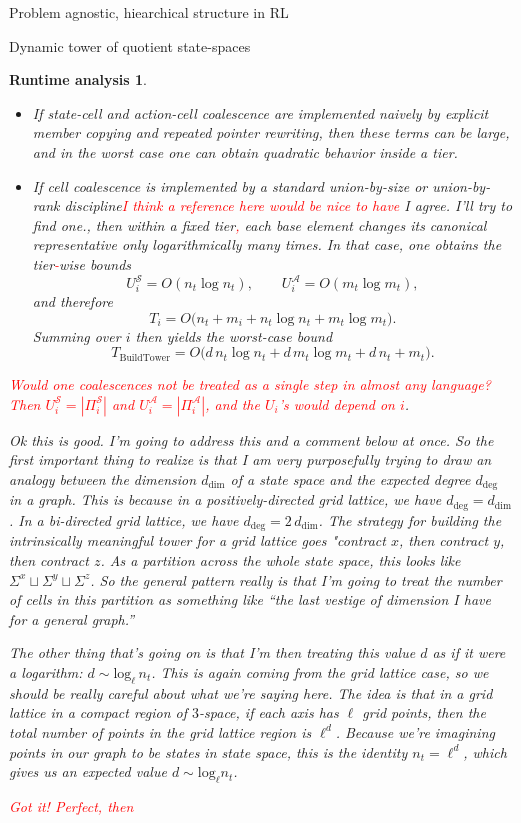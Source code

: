 \documentclass[11pt]{article}
\newtheorem{run_analysis}[subsubsection]{Runtime analysis}
\begin{document}
\begin{section}{Problem agnostic, hiearchical structure in RL}
\begin{subsection}{Dynamic tower of quotient state-spaces}
\begin{run_analysis}
\begin{itemize}
    \item If state-cell and action-cell coalescence are implemented naively by explicit member copying and repeated pointer rewriting, then these terms can be large, and in the worst case one can obtain quadratic behavior inside a tier.

    \item If cell coalescence is implemented by a standard union-by-size or union-by-rank discipline\textcolor{red}{I think a reference here would be nice to have} {\color{blue} I agree. I'll try to find one.}, then within a fixed tier\textcolor{red}{,} each base element changes its canonical representative only logarithmically many times. In that case, one obtains the tier\textcolor{red}{-}wise bounds
    \[
    U_i^{\mathcal S}=O(n_t\log n_t),
    \qquad
    U_i^{\mathcal A}=O(m_t\log m_t),
    \]
    and therefore
    \[
    T_i
    =
    O\bigl(n_t + m_i + n_t\log n_t + m_t\log m_t\bigr).
    \]
    Summing over $i$ then yields the worst-case bound
    \[
    T_{\mathrm{BuildTower}}
    =
    O\bigl(
    d\,n_t\log n_t + d\,m_t\log m_t + d\,n_t + m_t
    \bigr).
    \]
\end{itemize}
\textcolor{red}{Would one coalescences not be treated as a single step in almost any language? Then $U^{\mathcal{S}}_i = \left\vert\Pi^{\mathcal{S}}_i\right\vert$ and $U^{\mathcal{A}}_i = \left\vert\Pi^{\mathcal{A}}_i\right\vert$, and the $U_i$'s would depend on $i$}. {\color{blue} Ok this is good. I'm going to address this and a comment below at once. So the first important thing to realize is that I am very purposefully trying to draw an analogy between the dimension $d_\text{dim}$ of a state space and the expected degree $d_\text{deg}$ in a graph. This is because in a positively-directed grid lattice, we have $d_\text{deg}=d_\text{dim}$. In a bi-directed grid lattice, we have $d_\text{deg}=2\,d_\text{dim}$. The strategy for building the intrinsically meaningful tower for a grid lattice goes "contract $x$, then contract $y$, then contract $z$. As a partition across the whole state space, this looks like $\Sigma^x \sqcup \Sigma^y \sqcup \Sigma^z$. So the general pattern really is that I'm going to treat the number of cells in this partition as something like ``the last vestige of dimension I have for a general graph.''

The other thing that's going on is that I'm then treating this value $d$ as if it were a logarithm: $d\sim \text{log}_{\ell}\,n_{t}$. This is again coming from the grid lattice case, so we should be really careful about what we're saying here. The idea is that in a grid lattice {\em in a compact region of $3$-space}, if each axis has $\ell$ grid points, then the total number of points in the grid lattice region is $\ell^{d}$. Because we're imagining points in our graph to be states in state space, this is the identity $n_{t}=\ell^{d}$, which gives us an expected value $d\sim \text{log}_{\ell}n_{t}$.
}\textcolor{red}{Got it! Perfect, then}

\end{run_analysis}
\end{subsection}
\end{section}
\end{document}
